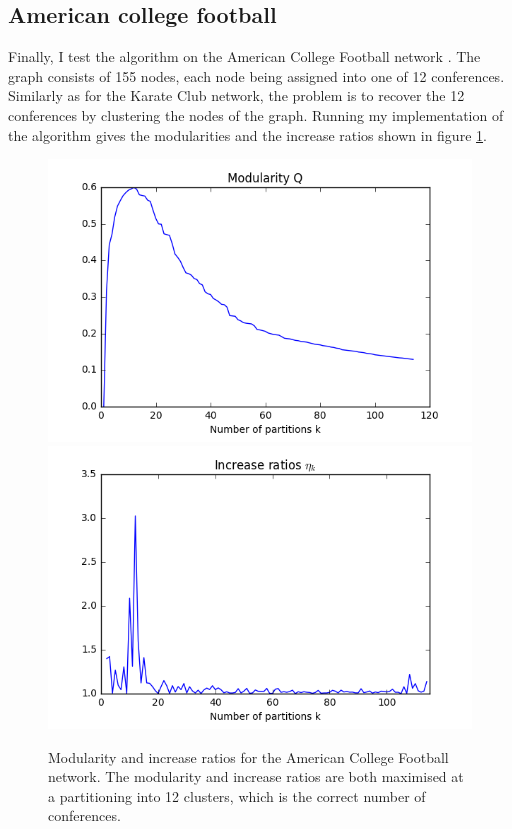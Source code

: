 \documentclass[12pt]{article}
\theoremstyle{definition}
\begin{document}
\subsection{American college football \cite{girvan2002community}}
Finally, I test the algorithm on the American College Football network \cite{girvan2002community}. The graph consists of 155 nodes, each node being assigned into one of 12 conferences. Similarly as for the Karate Club network, the problem is to recover the 12 conferences by clustering the nodes of the graph. Running my implementation of the algorithm gives the modularities and the increase ratios shown in figure \ref{fig_football_eval}.
\begin{figure}[h]
	\includegraphics[scale=0.44]{football_graph_Q}
	\includegraphics[scale=0.44]{football_graph_eta}
	\centering
	\caption{Modularity and increase ratios for the American College Football network. The modularity and increase ratios are both maximised at a partitioning into 12 clusters, which is the correct number of conferences.}
	\label{fig_football_eval}
\end{figure}
\end{document}
